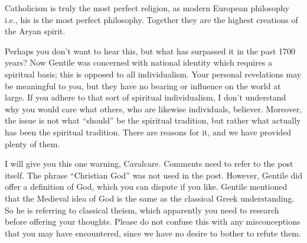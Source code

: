 \begin{footnotesize}
\begin{sffamily}
\begin{quotex}
Catholicism is truly the most perfect religion, as modern European philosophy i.e., his is the most perfect philosophy. Together they are the highest creations of the Aryan spirit.
\end{quotex}


Perhaps you don't want to hear this, but what has surpassed it in the past 1700 years? Now Gentile was concerned with national identity which requires a spiritual basis; this is opposed to all individualism. Your personal revelations may be meaningful to you, but they have no bearing or influence on the world at large. If you adhere to that sort of spiritual individualism, I don't understand why you would care what others, who are likewise individuals, believer. Moreover, the issue is not what ``should'' be the spiritual tradition, but rather what actually has been the spiritual tradition. There are reasons for it, and we have provided plenty of them.

I will give you this one warning, Cavalcare. Comments need to refer to the post itself. The phrase ``Christian God'' was not used in the post. However, Gentile did offer a definition of God, which you can dispute if you like. Gentile mentioned that the Medieval idea of God is the same as the classical Greek understanding. So he is referring to classical theism, which apparently you need to research before offering your thoughts. Please do not confuse this with any misconceptions that you may have encountered, since we have no desire to bother to refute them.

\hfill

\end{sffamily}
\end{footnotesize}

